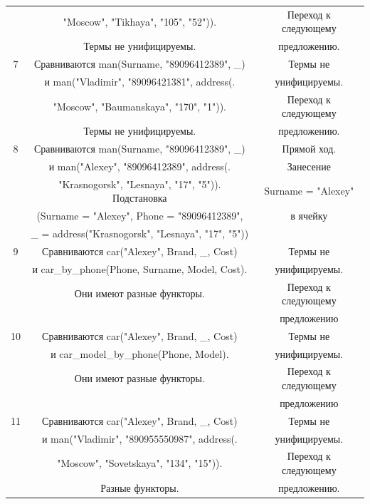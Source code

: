 \documentclass[12pt]{report}
\begin{document}
\begin{table}[H]
\begin{center}
\begin{tabular}{|c c c |}
		   	  & "Moscow"{}, "Tikhaya"{}, "105"{}, "52"{})).  & Переход к следующему \\
			  & Термы не унифицируемы. & предложению. \\
			\hline
			7 & Сравниваются man(Surname, "89096412389"{}, \_) & Термы не \\
			  & и man("Vladimir"{}, "89096421381"{}, address(. & унифицируемы. \\
			  & "Moscow"{}, "Baumanskaya"{}, "170"{}, "1"{})).  & Переход к следующему \\
			  & Термы не унифицируемы. & предложению. \\
			\hline
			8 & Сравниваются man(Surname, "89096412389"{}, \_) & Прямой ход. \\
			  & и man("Alexey"{}, "89096412389"{}, address(. & Занесение \\
			  & "Krasnogorsk"{}, "Lesnaya"{}, "17"{}, "5"{})). Подстановка & Surname = "Alexey"{} \\
			  & (Surname = "Alexey", Phone = "89096412389"{}, & в ячейку\\
			  & \_ = address("Krasnogorsk"{}, "Lesnaya"{}, "17"{}, "5"{})) &\\
			\hline
			9 & Сравниваются car("Alexey"{}, Brand, \_, Cost) & Термы не \\
			  & и car\_by\_phone(Phone, Surname, Model, Cost). & унифицируемы. \\
			  & Они имеют разные функторы. &Переход к следующему \\
			  & & предложению\\
			\hline
			10 & Сравниваются car("Alexey"{}, Brand, \_, Cost) & Термы не \\
			  & и car\_model\_by\_phone(Phone, Model). & унифицируемы. \\
			  & Они имеют разные функторы. &Переход к следующему \\
			  & & предложению\\
			\hline
			11 & Сравниваются car("Alexey"{}, Brand, \_, Cost) & Термы не \\
			  & и man("Vladimir"{}, "890955550987"{}, address(. & унифицируемы. \\
			  & "Moscow"{}, "Sovetskaya"{}, "134"{}, "15"{})).  & Переход к следующему \\
			  & Разные функторы. & предложению. \\
			\hline
		\end{tabular}
	\end{center}
\end{table}
\end{document}
